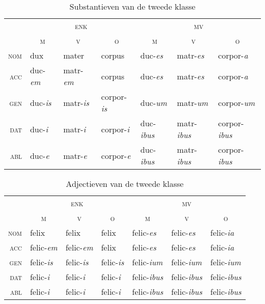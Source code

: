\documentclass[12pt,a4paper]{article}
\begin{document}
\begin{table}[H]
\centering
\begin{tabular}{ r | l l l | l l l }
\toprule
 & \multicolumn{3}{c|}{\textsc{enk}} & \multicolumn{3}{c}{\textsc{mv}} \\
 & \multicolumn{1}{c}{\textsc{m}} & \multicolumn{1}{c}{\textsc{v}} & \multicolumn{1}{c|}{\textsc{o}} & \multicolumn{1}{c}{\textsc{m}} & \multicolumn{1}{c}{\textsc{v}} & \multicolumn{1}{c}{\textsc{o}} \\ 
\midrule
\textsc{nom} & dux            & mater          & corpus           & duc-\emph{es}   & matr-\emph{es}   & corpor-\emph{a} \\
\textsc{acc} & duc-\emph{em}  & matr-\emph{em} & corpus           & duc-\emph{es}   & matr-\emph{es}   & corpor-\emph{a} \\
\textsc{gen} & duc-\emph{is}  & matr-\emph{is} & corpor-\emph{is} & duc-\emph{um}   & matr-\emph{um}   & corpor-\emph{um} \\
\textsc{dat} & duc-\emph{i}   & matr-\emph{i}  & corpor-\emph{i}  & duc-\emph{ibus} & matr-\emph{ibus} & corpor-\emph{ibus} \\
\textsc{abl} & duc-\emph{e}   & matr-\emph{e}  & corpor-\emph{e}  & duc-\emph{ibus} & matr-\emph{ibus} & corpor-\emph{ibus} \\
\bottomrule
\end{tabular}
\caption{Substantieven van de tweede klasse}
\label{tab:subst2}
\end{table}

\begin{table}[H]
\centering
\begin{tabular}{ r | l l l | l l l }
\toprule
 & \multicolumn{3}{c|}{\textsc{enk}} & \multicolumn{3}{c}{\textsc{mv}} \\
 & \multicolumn{1}{c}{\textsc{m}} & \multicolumn{1}{c}{\textsc{v}} & \multicolumn{1}{c|}{\textsc{o}} & \multicolumn{1}{c}{\textsc{m}} & \multicolumn{1}{c}{\textsc{v}} & \multicolumn{1}{c}{\textsc{o}} \\ 
\midrule
\textsc{nom} & felix           & felix           & felix           & felic-\emph{es}   & felic-\emph{es}   & felic-\emph{ia} \\
\textsc{acc} & felic-\emph{em} & felic-\emph{em} & felix           & felic-\emph{es}   & felic-\emph{es}   & felic-\emph{ia} \\
\textsc{gen} & felic-\emph{is} & felic-\emph{is} & felic-\emph{is} & felic-\emph{ium}  & felic-\emph{ium}  & felic-\emph{ium} \\
\textsc{dat} & felic-\emph{i}  & felic-\emph{i}  & felic-\emph{i}  & felic-\emph{ibus} & felic-\emph{ibus} & felic-\emph{ibus} \\
\textsc{abl} & felic-\emph{i}  & felic-\emph{i}  & felic-\emph{i}  & felic-\emph{ibus} & felic-\emph{ibus} & felic-\emph{ibus} \\
\bottomrule
\end{tabular}
\caption{Adjectieven van de tweede klasse}
\label{tab:adj2}
\end{table}
\end{document}
